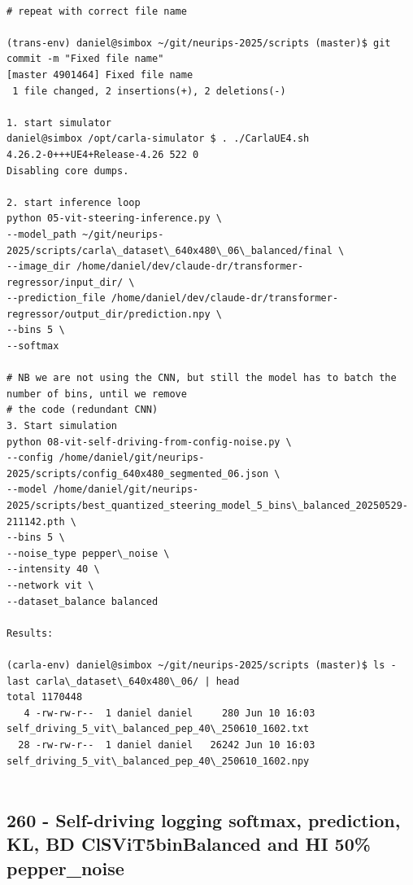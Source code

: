\begin{verbatim}

# repeat with correct file name

(trans-env) daniel@simbox ~/git/neurips-2025/scripts (master)$ git commit -m "Fixed file name"
[master 4901464] Fixed file name
 1 file changed, 2 insertions(+), 2 deletions(-)
 
1. start simulator
daniel@simbox /opt/carla-simulator $ . ./CarlaUE4.sh 
4.26.2-0+++UE4+Release-4.26 522 0
Disabling core dumps.

2. start inference loop
python 05-vit-steering-inference.py \
--model_path ~/git/neurips-2025/scripts/carla\_dataset\_640x480\_06\_balanced/final \
--image_dir /home/daniel/dev/claude-dr/transformer-regressor/input_dir/ \
--prediction_file /home/daniel/dev/claude-dr/transformer-regressor/output_dir/prediction.npy \
--bins 5 \
--softmax

# NB we are not using the CNN, but still the model has to batch the number of bins, until we remove
# the code (redundant CNN)
3. Start simulation
python 08-vit-self-driving-from-config-noise.py \
--config /home/daniel/git/neurips-2025/scripts/config_640x480_segmented_06.json \
--model /home/daniel/git/neurips-2025/scripts/best_quantized_steering_model_5_bins\_balanced_20250529-211142.pth \
--bins 5 \
--noise_type pepper\_noise \
--intensity 40 \
--network vit \
--dataset_balance balanced

Results:

(carla-env) daniel@simbox ~/git/neurips-2025/scripts (master)$ ls -last carla\_dataset\_640x480\_06/ | head
total 1170448
   4 -rw-rw-r--  1 daniel daniel     280 Jun 10 16:03 self_driving_5_vit\_balanced_pep_40\_250610_1602.txt
  28 -rw-rw-r--  1 daniel daniel   26242 Jun 10 16:03 self_driving_5_vit\_balanced_pep_40\_250610_1602.npy


\end{verbatim}

\subsection{260 - Self-driving logging softmax, prediction, KL, BD ClSViT5binBalanced and HI 50\% pepper\_noise}
\label{app_res:260}

